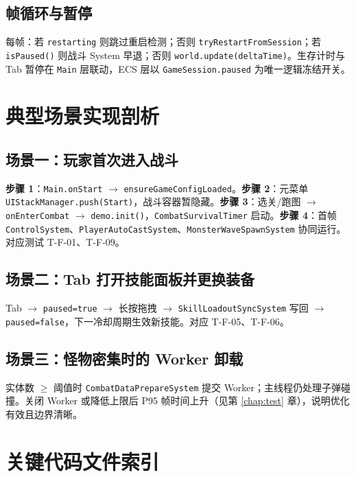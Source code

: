 \documentclass[UTF8,a4paper]{ctexart}
\begin{document}
\subsection{帧循环与暂停}

每帧：若 \texttt{restarting} 则跳过重启检测；否则 \texttt{tryRestartFromSession}；若 \texttt{isPaused()} 则战斗 System 早退；否则 \texttt{world.update(deltaTime)}。生存计时与 Tab 暂停在 \texttt{Main} 层联动，ECS 层以 \texttt{GameSession.paused} 为唯一逻辑冻结开关。

\section{典型场景实现剖析}
\label{sec:scenarios}

\subsection{场景一：玩家首次进入战斗}

\textbf{步骤 1}：\texttt{Main.onStart} $\rightarrow$ \texttt{ensureGameConfigLoaded}。\textbf{步骤 2}：元菜单 \texttt{UIStackManager.push(Start)}，战斗容器暂隐藏。\textbf{步骤 3}：选关/跑图 $\rightarrow$ \texttt{onEnterCombat} $\rightarrow$ \texttt{demo.init()}，\texttt{CombatSurvivalTimer} 启动。\textbf{步骤 4}：首帧 \texttt{ControlSystem}、\texttt{PlayerAutoCastSystem}、\texttt{MonsterWaveSpawnSystem} 协同运行。对应测试 T-F-01、T-F-09。

\subsection{场景二：Tab 打开技能面板并更换装备}

Tab $\rightarrow$ \texttt{paused=true} $\rightarrow$ 长按拖拽 $\rightarrow$ \texttt{SkillLoadoutSyncSystem} 写回 $\rightarrow$ \texttt{paused=false}，下一冷却周期生效新技能。对应 T-F-05、T-F-06。

\subsection{场景三：怪物密集时的 Worker 卸载}

实体数 $\geq$ 阈值时 \texttt{CombatDataPrepareSystem} 提交 Worker；主线程仍处理子弹碰撞。关闭 Worker 或降低上限后 P95 帧时间上升（见第 \ref{chap:test} 章），说明优化有效且边界清晰。

\section{关键代码文件索引}
\label{sec:file-index}
\end{document}
